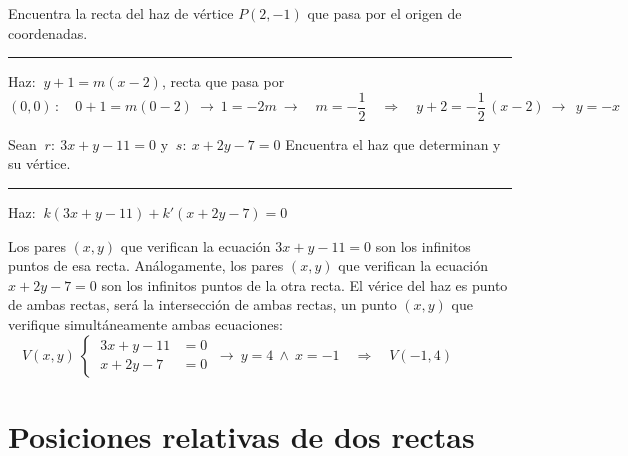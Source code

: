 \vspace{5mm}

\begin{miejercicio}
	
	Encuentra la recta del haz de vértice $P(2,-1)$ que pasa por el origen de coordenadas.
	
	\rule{250pt}{0.1pt}
	
\vspace{2mm} Haz: $\ y+1=m(x-2)$, recta que pasa por $(0,0)\, : \quad 0+1=m(0-2) \ \to \ 1=-2m \ \to \quad  m=-\dfrac 1 2 \quad \Rightarrow \quad y+2=-\dfrac 1 2 \, (x-2) \ 	 \to \ \ y=-x$

\end{miejercicio}

\begin{miejercicio}
	
Sean $\ r:\ 3x+y-11=0$ y $\ s:\ x+2y-7=0$ Encuentra el haz que determinan y su vértice.
	
	\rule{250pt}{0.1pt}
	
\vspace{2mm}  Haz: $\ k(3x+y-11)+k'(x+2y-7)=0$

\vspace{2mm} Los pares $(x,y)$ que verifican la ecuación $3x+y-11=0$ son los infinitos puntos de esa recta. Análogamente, los pares $(x,y)$ que verifican la ecuación $x+2y-7=0$ son los infinitos puntos de la otra recta. El vérice del haz es punto de ambas rectas, será la intersección de ambas rectas, un punto $(x,y)$ que verifique simultáneamente ambas ecuaciones:
$\quad V(x,y) \ \begin{cases} \ 3x+y-11 &=0 \\ \ x+2y-7&=0 \end{cases} \ \to\ y=4 \ \wedge \ x=-1 \quad \Rightarrow \quad V(-1,4)$

\end{miejercicio}

\vspace{1cm}
\section{Posiciones relativas de dos rectas}
\vspace{0.3cm}

